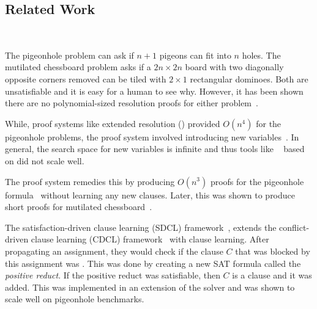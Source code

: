 



\subsection{Related Work}~\label{subsec:relatedwork}

The pigeonhole problem can ask if $n+1$ pigeons can fit into $n$ holes. The mutilated chessboard problem asks if a $2n \times 2n$ board with two diagonally opposite corners removed can be tiled with $2 \times 1$ rectangular dominoes. Both are unsatisfiable and it is easy for a human to see why. However, it has been shown there are no polynomial-sized resolution proofs for either problem~\cite{hakenpigeonhole,mutilatedchessboard-exponential}.




 While, proof systems like extended resolution (\er) provided $O(n^4)$ for the pigeonhole problems, the proof system involved introducing new variables~\cite{er}. In general, the search space for new variables is infinite and thus tools like \glucoser~\cite{glucoser} based on \er did not scale well.

The \pr proof system remedies this by producing $O(n^3)$ proofs for the pigeonhole formula~\cite{prclauses} without learning any new clauses. Later, this was shown to produce short proofs for mutilated chessboard~\cite{mutilatedchessboard-pr}. 

The satisfaction-driven clause learning (SDCL) framework~\cite{sdcl}, extends the conflict-driven clause learning (CDCL) framework~\cite{cdcl} with \pr clause learning. 
After propagating an assignment, they would check if the clause $C$ that was blocked by this assignment was \pr. This was done by creating a new SAT formula called the \emph{positive reduct}. If the positive reduct was satisfiable, then $C$ is a \pr clause and it was added. This was implemented in an extension of the solver \lingeling and was shown to scale well on pigeonhole benchmarks.

